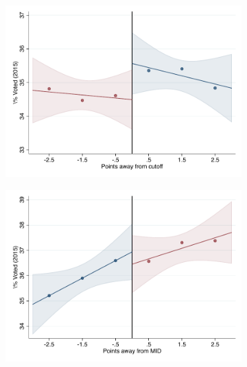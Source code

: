 \documentclass[oneside,11pt]{article}
\begin{document}
\begin{figure}[H]

    \ContinuedFloat
    \caption{(Cont.) RD plots for outcome variables across those assigned to IPN high-school, and those who are not\label{fig:ITT_rd_plot_IPN_3}}
    \begin{center}
    
    \begin{subfigure}{0.475\textwidth}
        \centering
        \includegraphics[width=\textwidth]{04_Figures/rd_plot_tau_Voto_Marcado_2015_IPN3.pdf}
    \end{subfigure}
    \begin{subfigure}{0.475\textwidth}
        \centering
        \includegraphics[width=\textwidth]{04_Figures/rd_plot_mid_Voto_Marcado_2015_IPN3.pdf}
    \end{subfigure}


\end{center}
\end{figure}
\end{document}
